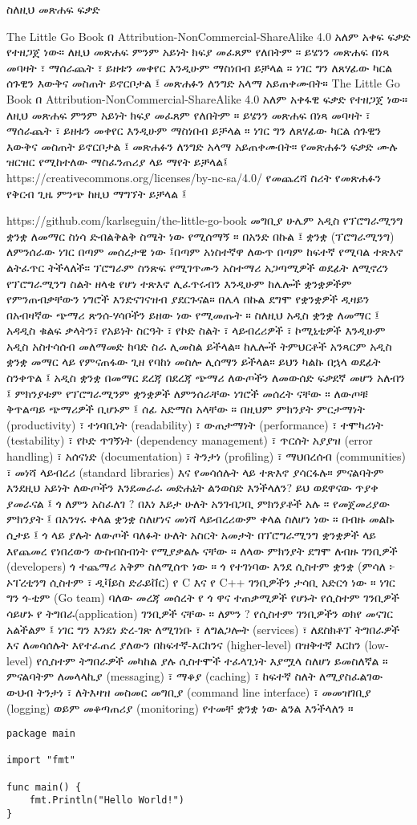 \documentclass[12pt,a4paper]{book}
\begin{document}
\noindent
\huge 
ስለዚህ መጽሐፍ
\normalsize
\vskip 0.5in
\huge 
\noindent
ፍቃድ
\vskip 0.3in

\normalsize
\noindent
The Little Go Book  በ Attribution-NonCommercial-ShareAlike 4.0 አለም አቀፍ ፍቃድ የተዘጋጀ ነው። ለዚህ መጽሐፍ ምንም አይነት ክፍያ መፈጸም የለበትም ። ይሄንን መጽሐፍ በነጻ መባዛት ፣ ማሰራጨት ፣ ይዘቱን መቀየር እንዲሁም ማስነበብ ይቻላል ። ነገር ግን ለጸሃፊው ካርል ሰጉዊን እውቅና መስጠት ይኖርቦታል ፤ መጽሐፉን ለንግድ አላማ አይጠቀሙበት።
\vskip 0.3in
\noindent
The Little Go Book  በ Attribution-NonCommercial-ShareAlike 4.0 አለም አቀፋዊ ፍቃድ የተዘጋጀ ነው። ለዚህ መጽሐፍ ምንም አይነት ክፍያ መፈጸም የለበትም ። ይሄንን መጽሐፍ በነጻ መባዛት ፣ ማሰራጨት ፣ ይዘቱን መቀየር እንዲሁም ማስነበብ ይቻላል ። ነገር ግን ለጸሃፊው ካርል ሰጉዊን እውቅና መስጠት ይኖርቦታል ፤ መጽሐፉን ለንግድ አላማ አይጠቀሙበት።
የመጽሐፉን ፍቃድ ሙሉ ዝርዝር የሚከተለው ማስፈንጠሪያ ላይ ማየት ይቻላል፤
https://creativecommons.org/licenses/by-nc-sa/4.0/
\vskip 0.3in
\noindent
\huge የመጨረሻ ስሪት
\normalsize
\vskip 0.3in
\noindent
የመጽሐፉን የቅርብ ጊዜ ምንጭ ከዚህ ማግኘት ይቻላል ፤ 

https://github.com/karlseguin/the-little-go-book
\vskip 0.3in
\huge
\noindent
መግቢያ
\normalsize
\vskip 0.3in
\noindent
ሁሌም አዲስ የፕሮግራሚንግ ቋንቋ ለመማር ስነሳ ድብልቅልቅ ስሜት ነው የሚሰማኝ ። በአንድ በኩል ፤ ቋንቋ (ፕሮግራሚንግ) ለምንሰራው ነገር በጣም መሰረታዊ ነው ፤በጣም አነስተኛዋ ለውጥ በጣም ከፍተኛ የሚባል ተጽእኖ ልትፈጥር ትችላለች። ፕሮግራም ስንጽፍ የሚገጥሙን አስተማሪ አጋጣሚዎች ወደፊት ለሚኖረን የፕሮግራሚንግ ስልት ዘላቂ የሆነ ተጽእኖ ሊፈጥሩብን እንዲሁም ከሌሎች ቋንቋዎችም የምንጠብቃቸውን ነግሮች እንድናገናዝብ ያደርጉናል። በሌላ በኩል ደግሞ የቋንቋዎች ዲዛይን በአብዛኛው ጭማሪ ጽንሰ-ሃሳቦችን ይዘው ነው የሚመጡት ። ስለዚህ አዲስ ቋንቋ ለመማር ፤ አዳዲስ ቁልፍ ቃላትን፣ የአይነት ስርዓት ፣ የኮድ ስልት ፣ ላይብረሪዎች ፣ ኮሚኒቲዎች እንዲሁም አዲስ አስተሳሰብ መለማመድ ከባድ ስራ ሊመስል ይችላል። ከሌሎች ትምህርቶች አንጻርም አዲስ ቋንቋ መማር ላይ የምናጠፋው ጊዘ የባከነ መስሎ ሊሰማን ይችላል።
\vskip 0.3in
\noindent
ይህን ካልኩ በኋላ ወደፊት ስንቀጥል ፤ አዲስ ቋንቋ በመማር ደረጃ በደረጃ ጭማሪ ለውጦችን ለመውሰድ ፍቃደኛ መሆን አለብን ፤ ምክንያቱም የፕሮግራሚንም ቋንቋዎች ለምንሰራቸው ነገሮች መሰረት ናቸው ። ለውጦቹ ቅጥልጣይ ጭማሪዎች ቢሆኑም ፤ ሰፊ አድማስ አላቸው ። በዚህም ምክንያት ምርታማነት (productivity) ፣ ተነባቢነት (readability) ፣ ውጠታማነት (performance) ፣ ተሞካሪነት (testability) ፣ የኮድ ጥገኝነት (dependency management) ፣ ጥርሰት አያያዝ (error handling) ፣ አሰናነድ (documentation) ፣ ትንታነ (profiling) ፣ ማህበረሰብ (communities) ፣ መነሻ ላይብረሪ (standard libraries) እና የመሳሰሉት ላይ ተጽእኖ ያሳርፋሉ። ምናልባትም እንደዚህ አይነት ለውጦችን እንደመራራ መድሐኒት ልንወስድ እንችላለን?
\vskip 0.3in
\noindent
ይህ ወደዋናው ጥያቀ ያመራናል ፤ ጎ ለምን አስፈለገ ? በእነ እይታ ሁለት አንገብጋቢ ምክንያቶች አሉ ። የመጀመሪያው ምክንያት ፤ በአንፃሩ ቀላል ቋንቋ ስለሆነና መነሻ ላይብረሪውም ቀላል ስለሆነ ነው ። በብዙ መልኩ ሲታይ ፤ ጎ ላይ ያሉት ለውጦች ባለፉት ሁለት አስርት አመታት በፕሮግራሚንግ ቋንቋዎች ላይ እየጨመረ የነበረውን ውስብስብነት የሚያቃልሉ ናቸው ። ለላው ምክንያት ደግሞ ለብዙ ገንቢዎች (developers) ጎ ተጨማሪ አቅም ስለሚሰጥ ነው ።
\vskip 0.3in
\noindent
ጎ የተገነባው እንደ ሲስተም ቋንቋ (ምሳለ ፦ ኦፐረቲንግ ሲስተም ፣ ዲቫይስ ድራይቨር) የ C እና የ C++ ገንቢዎችን ታሳቢ አድርጎ ነው ። ነገር ግን ጎ-ቲም (Go team) ባለው መረጃ መሰረት የ ጎ ዋና ተጠቃሚዎች የሆኑት የሲስተም ገንቢዎች ሳይሆኑ የ ትግበራ(application) ገንቢዎች ናቸው ። ለምን ? የሲስተም ገንቢዎችን ወክየ መናገር አልችልም ፤ ነገር ግን እንደነ ድረ-ገጽ ለሚገነቡ ፣ ለግልጋሎት (services) ፣ ለደስክቶፕ ትግበራዎች እና ለመሳሰሉት እየተፈጠረ ያለውን በከፍተኛ-እርከንና (higher-level) በዝቅተኛ እርከን (low-level) የሲስተም ትግበራዎች መካከል ያሉ ሲስተሞች ተፈላጊነት እያሟላ ስለሆነ ይመስለኛል ። 
\vskip 0.3in
\noindent
ምናልባትም ለመላላኪያ (messaging) ፣ ማቆያ (caching) ፣ ከፍተኛ ስለት ለሚያስፈልገው ውህብ ትንታነ ፣ ለትእዛዝ መስመር መግቢያ (command line interface) ፣ መመዝገቢያ (logging) ወይም መቆጣጠሪያ (monitoring) የተመቸ ቋንቋ ነው ልንል እንችላለን ። 




\begin{lstlisting}
package main

import "fmt"

func main() {
    fmt.Println("Hello World!")
}
\end{lstlisting}
\end{document}
